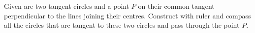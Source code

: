 Given are two tangent circles and a point $P$ on their common tangent perpendicular to the lines joining their centres. Construct with ruler and compass all the circles that are tangent to these two circles and pass through the point $P$.